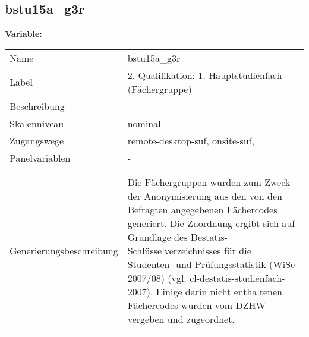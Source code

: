 	
	
	\subsection{bstu15a\_g3r}
	\label{subSection:bstu15a_g3r}

	\noindent\textbf{Variable:}\\
		\begin{tabular}{lL{11.3cm}}
			\label{tableVariable:bstu15a_g3r}
			Name & bstu15a\_g3r \\
			Label & 2. Qualifikation: 1. Hauptstudienfach (Fächergruppe) \\
			Beschreibung & - \\
			Skalenniveau & nominal \\
			Zugangswege &
				remote-desktop-suf,
				onsite-suf,
 \\
			Panelvariablen & -
			 \\
			 \\
 \\
					Generierungsbeschreibung & Die Fächergruppen wurden zum Zweck der Anonymisierung aus den von den Befragten angegebenen Fächercodes generiert. Die Zuordnung ergibt sich auf Grundlage des Destatis-Schlüsselverzeichnisses für die Studenten- und Prüfungsstatistik (WiSe 2007/08) (vgl. cl-destatis-studienfach-2007).  Einige darin nicht enthaltenen Fächercodes wurden vom DZHW vergeben und zugeordnet. 
				 \\	
			 \\
		\end{tabular}






